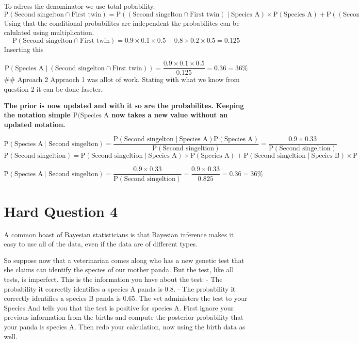 \documentclass[]{article}
\begin{document}
To adress the denominator we use total pobability.
\[  {\textrm{P}( \textrm{Second singelton} \cap  \textrm{First twin} )} =  {\textrm{P}( (\textrm{Second singelton} \cap  \textrm{First twin} ) \mid  \textrm{Species A})} \times  \textrm{P}(   \textrm{Species A} ) +  {\textrm{P}( (\textrm{Second singelton} \cap  \textrm{First twin} ) \mid  \textrm{Species B})} \times \textrm{P}(   \textrm{Species B} )\]
Using that the conditional probabilites are independent the probabilites
can be calulated using multiplication.
\[  {\textrm{P}( \textrm{Second singelton} \cap  \textrm{First twin} )} = 0.9 \times 0.1 \times 0.5 +  0.8 \times 0.2 \times 0.5 = 0.125 \]
Inserting this

\[ \textrm{P}(\textrm{Species A} \mid ( \textrm{Second singelton} \cap  \textrm{First twin} )) = \frac{0.9 \times 0.1 \times 0.5}{0.125} = 0.36 = 36\%\]
\#\# Aproach 2 Appraoch 1 was allot of work. Stating with what we know
from question 2 it can be done faseter.

\textbf{The prior is now updated and with it so are the probabilites.
Keeping the notation simple \(\textrm{P}(\textrm{Species A}\) now takes
a new value without an updated notation.}

\[ \textrm{P}(\textrm{Species A} \mid  \textrm{Second singelton})  =   \frac{\textrm{P}( \textrm{Second singelton}\mid\textrm{Species A} )\textrm{P}(\textrm{Species A})}{\textrm{P}(\textrm{Second singeltion}) }  = \frac{ 0.9 \times  0.33}{\textrm{P}(\textrm{Second singeltion}) }\]
\[\textrm{P}(\textrm{Second singeltion}) = \textrm{P}(\textrm{Second singeltion} \mid \textrm{Species A}) \times \textrm{P}(\textrm{Species A})  + \textrm{P}(\textrm{Second singeltion} \mid \textrm{Species B}) \times \textrm{P}(\textrm{Species A}) = 0.9 \times 0.33 + 0.8 \times 0.66 = 0.825\]

\[ \textrm{P}(\textrm{Species A} \mid  \textrm{Second singelton})  = \frac{ 0.9 \times  0.33}{\textrm{P}(\textrm{Second singeltion}) } =  \frac{ 0.9 \times  0.33}{ 0.825 } = 0.36 = 36\% \]

\section{Hard Question 4}\label{hard-question-4}

A common boast of Bayesian statisticians is that Bayesian inference
makes it easy to use all of the data, even if the data are of different
types.

So suppose now that a veterinarian comes along who has a new genetic
test that she claims can identify the species of our mother panda. But
the test, like all tests, is imperfect. This is the information you have
about the test: - The probability it correctly identifies a species A
panda is 0.8. - The probability it correctly identifies a species B
panda is 0.65. The vet administers the test to your Species And tells
you that the test is positive for species A. First ignore your previous
information from the births and compute the posterior probability that
your panda is species A. Then redo your calculation, now using the birth
data as well.
\end{document}
